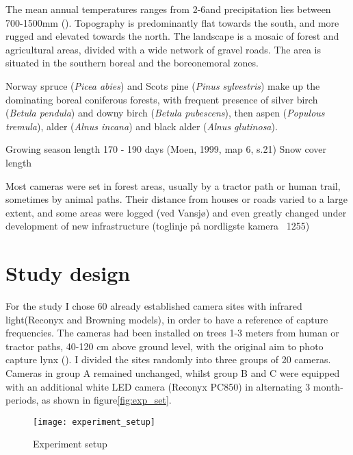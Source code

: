 The mean annual temperatures ranges from 2-6\celsius  and precipitation lies between 700-1500mm (\cite{Moen1999}). 
Topography is predominantly flat towards the south, and more rugged and elevated towards the north. The landscape is a mosaic of forest and agricultural areas, divided with a wide network of gravel roads.
The area is situated in the southern boreal and the boreonemoral zones. %

Norway spruce (\textit{Picea abies}) and Scots pine (\textit{Pinus sylvestris}) make up the dominating boreal coniferous forests, with frequent presence of silver birch (\textit{Betula pendula}) and downy birch (\textit{Betula pubescens}), then aspen (\textit{Populous tremula}), alder (\textit{Alnus incana}) and black alder (\textit{Alnus glutinosa}).

Growing season length 170 - 190 days (Moen, 1999, map 6, s.21) %
Snow cover length												%

Most cameras were set in forest areas, usually by a tractor path or human trail, sometimes by animal paths. Their distance from houses or roads varied to a large extent, and some areas were logged (ved Vansjø) and even greatly changed under development of new infrastructure (toglinje på nordligste kamera ~1255)


\section{Study design} %
For the study I chose 60 already established camera sites with infrared light(Reconyx and Browning models), in order to have a reference of capture frequencies. The cameras had been installed on trees 1-3 meters from human or tractor paths, 40-120 cm above ground level, with the original aim to photo capture lynx (\cite{Odden2015}). 
I divided the sites randomly into three groups of 20 cameras. Cameras in group A remained unchanged, whilst group B and C were equipped with an additional white LED camera (Reconyx PC850) in alternating 3 month-periods, as shown in figure\vref{fig:exp_set}.

\begin{figure}
    \begin{center}
    	\texttt{[image: experiment\_setup]} %
    \end{center}
    	\caption{Experiment setup}
    \label{fig:exp_set}
\end{figure}


